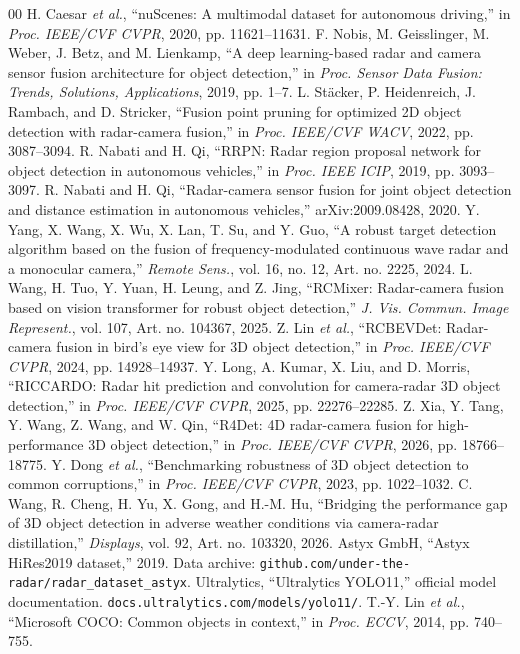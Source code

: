 \documentclass[conference,10pt,a4paper]{IEEEtran}
\begin{document}
\begin{thebibliography}{00}
 H. Caesar \emph{et al.}, ``nuScenes: A multimodal dataset for autonomous driving,'' in \emph{Proc. IEEE/CVF CVPR}, 2020, pp. 11621--11631.
 F. Nobis, M. Geisslinger, M. Weber, J. Betz, and M. Lienkamp, ``A deep learning-based radar and camera sensor fusion architecture for object detection,'' in \emph{Proc. Sensor Data Fusion: Trends, Solutions, Applications}, 2019, pp. 1--7.
 L. Stäcker, P. Heidenreich, J. Rambach, and D. Stricker, ``Fusion point pruning for optimized 2D object detection with radar-camera fusion,'' in \emph{Proc. IEEE/CVF WACV}, 2022, pp. 3087--3094.
 R. Nabati and H. Qi, ``RRPN: Radar region proposal network for object detection in autonomous vehicles,'' in \emph{Proc. IEEE ICIP}, 2019, pp. 3093--3097.
 R. Nabati and H. Qi, ``Radar-camera sensor fusion for joint object detection and distance estimation in autonomous vehicles,'' arXiv:2009.08428, 2020.
 Y. Yang, X. Wang, X. Wu, X. Lan, T. Su, and Y. Guo, ``A robust target detection algorithm based on the fusion of frequency-modulated continuous wave radar and a monocular camera,'' \emph{Remote Sens.}, vol. 16, no. 12, Art. no. 2225, 2024.
 L. Wang, H. Tuo, Y. Yuan, H. Leung, and Z. Jing, ``RCMixer: Radar-camera fusion based on vision transformer for robust object detection,'' \emph{J. Vis. Commun. Image Represent.}, vol. 107, Art. no. 104367, 2025.
 Z. Lin \emph{et al.}, ``RCBEVDet: Radar-camera fusion in bird's eye view for 3D object detection,'' in \emph{Proc. IEEE/CVF CVPR}, 2024, pp. 14928--14937.
 Y. Long, A. Kumar, X. Liu, and D. Morris, ``RICCARDO: Radar hit prediction and convolution for camera-radar 3D object detection,'' in \emph{Proc. IEEE/CVF CVPR}, 2025, pp. 22276--22285.
 Z. Xia, Y. Tang, Y. Wang, Z. Wang, and W. Qin, ``R4Det: 4D radar-camera fusion for high-performance 3D object detection,'' in \emph{Proc. IEEE/CVF CVPR}, 2026, pp. 18766--18775.
 Y. Dong \emph{et al.}, ``Benchmarking robustness of 3D object detection to common corruptions,'' in \emph{Proc. IEEE/CVF CVPR}, 2023, pp. 1022--1032.
 C. Wang, R. Cheng, H. Yu, X. Gong, and H.-M. Hu, ``Bridging the performance gap of 3D object detection in adverse weather conditions via camera-radar distillation,'' \emph{Displays}, vol. 92, Art. no. 103320, 2026.
 Astyx GmbH, ``Astyx HiRes2019 dataset,'' 2019. Data archive: \texttt{github.com/under-the-radar/}\allowbreak\texttt{radar\_dataset\_astyx}.
 Ultralytics, ``Ultralytics YOLO11,'' official model documentation. \texttt{docs.ultralytics.com/models/yolo11/}.
 T.-Y. Lin \emph{et al.}, ``Microsoft COCO: Common objects in context,'' in \emph{Proc. ECCV}, 2014, pp. 740--755.
\end{thebibliography}
\end{document}

